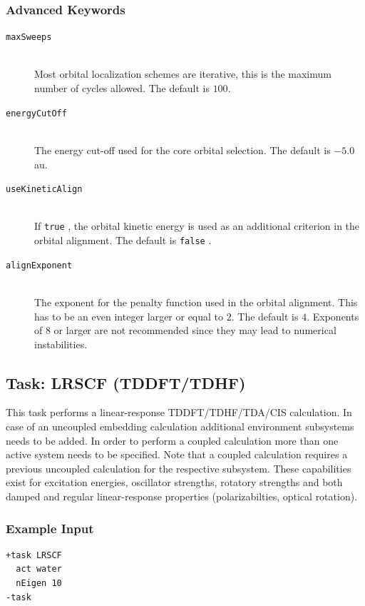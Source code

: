 \documentclass[bibliography=totocnumbered,a4paper,10pt,oneside]{scrbook}
\newcommand{\ttt}[1]{%
  \begingroup\setlength{\fboxsep}{1pt}%
  \colorbox{serenity-green!30}{\texttt{\hspace*{2pt}\vphantom{(g}#1\hspace*{2pt}}}%
  \endgroup
}
\begin{document}
\subsubsection{Advanced Keywords}
\begin{description}
 \item [\texttt{maxSweeps}]\hfill \\
   Most orbital localization schemes are iterative, this is the maximum number of cycles allowed.
   The default is $100$.
 \item [\texttt{energyCutOff}]\hfill \\
   The energy cut-off used for the core orbital selection. The default is $-5.0$ au.
 \item [\texttt{useKineticAlign}]\hfill \\
   If \ttt{true}, the orbital kinetic energy is used as an additional criterion in the orbital alignment.
   The default is \ttt{false}.
 \item [\texttt{alignExponent}]\hfill \\
   The exponent for the penalty function used in the orbital alignment. This has to be an even integer
   larger or equal to $2$. The default is $4$. Exponents of $8$ or larger are not recommended since they
   may lead to numerical instabilities.
\end{description}

\clearpage
\subsection{Task: LRSCF (TDDFT/TDHF)}
This task performs a linear-response TDDFT/TDHF/TDA/CIS calculation. In case of an uncoupled embedding calculation additional environment subsystems needs to be added. In order to perform a coupled calculation more than one active system needs to be specified. Note that a coupled calculation requires a previous uncoupled calculation for the respective subsystem. These capabilities exist for excitation energies, oscillator strengths, rotatory strengths and both damped and regular linear-response properties (polarizabilties, optical rotation).
\subsubsection{Example Input}
\begin{lstlisting}
+task LRSCF
  act water
  nEigen 10
-task
\end{lstlisting}
\end{document}
